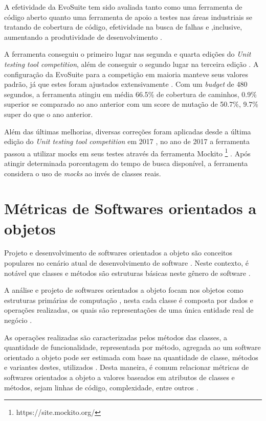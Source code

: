 \documentclass[
	12pt,				%
	oneside,			%
	a4paper,			%
	english,			%
	brazil				%
	]{abntex2ppgsi}
\begin{document}
A efetividade da EvoSuite tem sido avaliada tanto como uma ferramenta de código aberto quanto uma ferramenta de apoio a testes nas áreas industriais se tratando de cobertura de código, efetividade na busca de falhas e ,inclusive, aumentando a produtividade de desenvolvimento \cite{Fraser2017}. 

A ferramenta conseguiu o primeiro lugar nas segunda e quarta edições do \textit{Unit testing tool competition}, além de conseguir o segundo lugar na terceira edição \cite{Fraser2017}. A configuração da EvoSuite para a competição em maioria manteve seus valores padrão, já que estes foram ajustados extensivamente \cite{Fraser2017}. Com um \textit{budget} de 480 segundos, a ferramenta atingiu em média 66.5\% de cobertura de caminhos, 0.9\% superior se comparado ao ano anterior com um score de mutação de 50.7\%, 9.7\% super do que o ano anterior. \cite{Fraser2017}

Além das últimas melhorias, diversas correções foram aplicadas desde a última edição do \textit{Unit testing tool competition} em 2017  \cite{Fraser2017}, no ano de 2017 a ferramenta passou a utilizar mocks em seus testes através da ferramenta Mockito \footnote{https://site.mockito.org/} \cite{Fraser2017}. Após atingir determinada porcentagem do tempo de busca disponível, a ferramenta considera o uso de \textit{mocks} ao invés de classes reais.  \cite{Fraser2017}


\chapter{Métricas de Softwares orientados a objetos}
\label{chap:metricas}

Projeto e desenvolvimento de softwares orientados a objeto são conceitos populares no cenário atual de desenvolvimento de software \cite{srivastava2013}. Neste contexto, é notável que classes e métodos são estruturas básicas neste gênero de software \cite{kan95}. 

A análise e projeto de softwares orientados a objeto focam nos objetos como estruturas primárias de computação \cite{kan95} \cite{srivastava2013}, nesta cada classe é composta por dados e operações realizadas, os quais  são representações de uma única entidade real de negócio \cite{srivastava2013}.

As operações realizadas são caracterizadas pelos métodos das classes, a quantidade de funcionalidade, representada por método, agregada ao um software orientado a objeto pode ser estimada com base na quantidade de classe, métodos e variantes destes, utilizados \cite{kan95}. Desta maneira, é comum relacionar métricas de softwares orientados a objeto a valores baseados em atributos de classes e métodos, sejam linhas de código, complexidade, entre outros \cite{kan95}.
\end{document}
